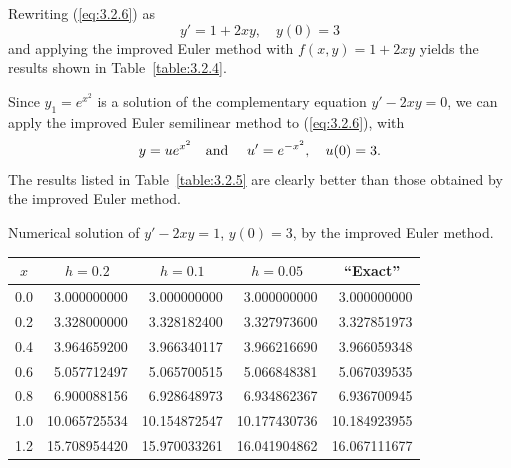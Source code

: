 \begin{examplesolution}
 Rewriting (\ref{eq:3.2.6}) as
\[
  y'=1+2xy,\quad y(0)=3
\]
and applying the improved Euler method with $f(x,y)=1+2xy$ yields the results shown in
Table~\ref{table:3.2.4}.

 Since $y_{1}=e^{x^{2}}$ is a solution of the complementary equation $y'-2xy=0$, we
can apply the improved Euler semilinear method to (\ref{eq:3.2.6}), with
\[
  y=ue^{x^{2}}\mbox{\quad and \quad}u'=e^{-x^{2}},\quad u(0)=3.
\]
The results listed in Table~\ref{table:3.2.5} are clearly better than those obtained by the improved
Euler method.

\begin{newtable}
  \label{table:3.2.4} Numerical solution of $y'-2xy=1$, $y(0)=3$, by the improved Euler method.
  \begin{center}
    \begin{tabular}{|c|r|r|r|r|}
      \hline
      \multicolumn{1}{|c|}{$x$} & \multicolumn{1}{|c|}{$h=0.2$} & \multicolumn{1}{|c|}{$h=0.1$} & \multicolumn{1}{|c|}{$h=0.05$} & \multicolumn{1}{|c|}{``Exact''} \\
      \hline
      0.0                       & 3.000000000                   & 3.000000000                   & 3.000000000                    & 3.000000000                     \\
      0.2                       & 3.328000000                   & 3.328182400                   & 3.327973600                    & 3.327851973                     \\
      0.4                       & 3.964659200                   & 3.966340117                   & 3.966216690                    & 3.966059348                     \\
      0.6                       & 5.057712497                   & 5.065700515                   & 5.066848381                    & 5.067039535                     \\
      0.8                       & 6.900088156                   & 6.928648973                   & 6.934862367                    & 6.936700945                     \\
      1.0                       & 10.065725534                  & 10.154872547                  & 10.177430736                   & 10.184923955                    \\
      1.2                       & 15.708954420                  & 15.970033261                  & 16.041904862                   & 16.067111677                    \\

\end{tabular}
\end{center}
\end{newtable}
\end{examplesolution}
